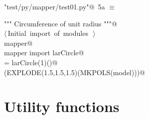 \documentclass[11pt,oneside]{article}	%
\begin{document}
\begin{flushleft} \small \label{scrap14}
\protect{}\verb@"test/py/mapper/test01.py"@\nobreak\ {\footnotesize 5a }$\equiv$
\vspace{-1ex}
\begin{list}{}{} \item
\mbox{}\verb@""" Circumference of unit radius """@\\
\mbox{}\verb@@\hbox{$\langle\,$Initial import of modules\nobreak\ {\footnotesize {}}$\,\rangle$}\verb@@\\
\mbox{}\verb@import mapper@\\
\mbox{}\verb@from mapper import larCircle@\\
\mbox{}\verb@model = larCircle(1)()@\\
\mbox{}\verb@VIEW(EXPLODE(1.5,1.5,1.5)(MKPOLS(model)))@\\
\mbox{}\verb@@{\NWsep}
\end{list}
\vspace{-2ex}
\end{flushleft}


\appendix
\section{Utility functions}
\end{document}
